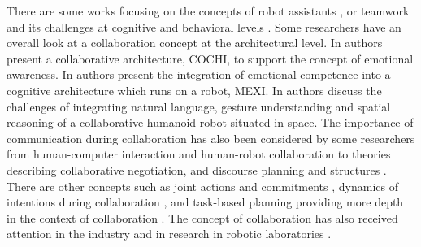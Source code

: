 \documentclass[12pt]{report}
\begin{document}
There are some works focusing on the concepts of robot assistants
\cite{clancey:agent-assistants-collaboration}, or teamwork and its challenges at
cognitive and behavioral levels \cite{nikolaidis:collaboration-joint-action,
scerri:prototype-distributed-teams}. Some researchers
have an overall look at a collaboration concept at the architectural level. In
\cite{garcia:collaboration-emotional-awareness} authors present a collaborative
architecture, COCHI, to support the concept of emotional awareness. In
\cite{esau:integrating-emotion-collaboration} authors present the integration of
emotional competence into a cognitive architecture which runs on a robot, MEXI.
In \cite{sofge:collaboration-humanoid-space} authors discuss the challenges of
integrating natural language, gesture understanding and spatial reasoning of a
collaborative humanoid robot situated in space. The importance of communication
during collaboration has also been considered by some researchers from
human-computer interaction and human-robot collaboration
\cite{clair:action-intention-collaboraiton,
matignon:verbal-nonverbal-collaboration, rich:discourse} to theories describing
collaborative negotiation, and discourse planning and structures
\cite{andriessen:disourse-planning, grosz:discourse-structure,
sidner:discourse-collaborative-negotiation}. There are other concepts such as
joint actions and commitments \cite{grosz:intention-dynamics-collaboration},
dynamics of intentions during collaboration \cite{levesque:acting-together}, and
task-based planning providing more depth in the context of collaboration
\cite{burghart:cognitive-architecture-robot, rich:cea}. The concept of
collaboration has also received attention in the industry and in research in
robotic laboratories \cite{green:collaboration-literature-review}.
\end{document}

